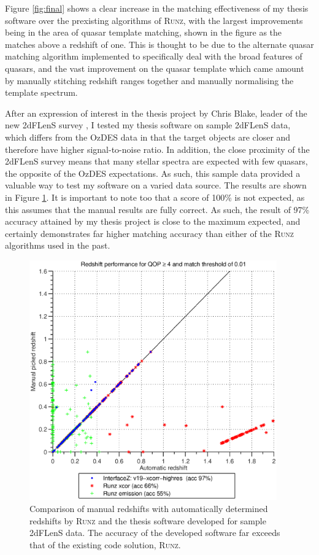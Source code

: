 \documentclass[titlesmallcaps, examinerscopy, copyrightpage]{uqthesis}
\newcommand{\runz}{\textsc{Runz}}
\begin{document}
Figure \ref{fig:final} shows a clear increase in the matching effectiveness of my thesis software over the prexisting algorithms of \runz{}, with the largest improvements being in the area of quasar template matching, shown in the figure as the matches above a redshift of one. This is thought to be  due to the alternate quasar matching algorithm implemented to specifically deal with the broad features of quasars, and the vast improvement on the quasar template which came amount by manually stitching redshift ranges together and manually normalising the template spectrum.


After an expression of interest in the thesis project by Chris Blake, leader of the new 2dFLenS survey \cite{2dFLenS}, I tested my thesis software on sample 2dFLenS data, which differs from the OzDES data in that the target objects are closer and therefore have higher signal-to-noise ratio. In addition, the close proximity of the 2dFLenS survey means that many stellar spectra are expected with few quasars, the opposite of the OzDES expectations. As such, this sample data provided a valuable way to test my software on a varied data source. The results are shown in Figure \ref{fig:2dF}. It is important to note too that a score of 100\% is not expected, as this assumes that the manual results are fully correct. As such, the result of 97\% accuracy attained by my thesis project is close to the maximum expected, and certainly demonstrates far higher matching accuracy than either of the \runz{} algorithms used in the past.

\begin{figure}[ht!]
\includegraphics[width=0.95\textwidth]{images/2df.eps} 
\centering
\caption{Comparison of manual redshifts with automatically determined redshifts by \runz{} and the thesis software developed for sample 2dFLenS data. The accuracy of the developed software far exceeds that of the existing code solution, \runz{}.}
\label{fig:2dF}
\end{figure}
\end{document}

